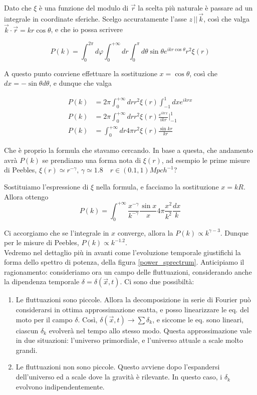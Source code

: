 \documentclass{report}
\begin{document}
Dato che $\xi$ è una funzione del modulo di $\vec{r}$ la scelta più naturale è passare ad un integrale in coordinate sferiche. Scelgo accuratamente l'asse $z \, || \, \vec{k}$, così che valga $\vec{k}\cdot \vec{r} = kr\cos{\theta}$, e che io possa scrivere 

\begin{equation}
    P(k) = \int_0^{2\pi}d\varphi\int_0^{+\infty}dr\int_0^\pi d\theta \sin{\theta}e^{ikr\cos{\theta}}  r^2 \xi(r)
\end{equation}

A questo punto conviene effettuare la sostituzione $x = \cos{\theta}$, così che $dx = -\sin{\theta}d\theta$, e dunque che valga 

\begin{align}
    P(k) &= 2\pi \int_0^{+\infty}dr r^2\xi(r)\int_{-1}^1dx e^{ikrx} \\
    P(k)&= 2\pi \int_0^{+\infty}dr r^2\xi(r)\frac{e^{ikrx}}{ikr}\biggr|^1_{-1} \\
    P(k )&= \int_0^{+\infty}dr 4\pi r^2\xi(r)\frac{\sin{kr}}{kr} 
\end{align}

Che è proprio la formula che stavamo cercando. In base a questa, che andamento avrà $P(k)$ se prendiamo una forma nota di $\xi(r)$, ad esempio le prime misure di Peebles, $\xi(r) \simeq r^{-\gamma}, \, \gamma \simeq 1.8 \quad r\in (0.1, 1) Mpch^{-1}$?

Sostituiamo l'espressione di $\xi$ nella formula, e facciamo la sostituzione $x = kR$. Allora ottengo 
\begin{equation}
    P(k) = \int_0^{+\infty} \frac{x^{-\gamma}}{k^{-\gamma}}\frac{\sin{x}}{x}4\pi\frac{x^2}{k^2}\frac{dx}{k}
\end{equation}

Ci accorgiamo che se l'integrale in $x$ converge, allora la $P(k) \propto k^{\gamma -3}$. Dunque per le misure di Peebles, $P(k)\propto k^{-1.2}$. \\

Vedremo nel dettaglio più in avanti come l'evoluzione temporale giustifichi la forma dello spettro di potenza, della figura \ref{power_sprectrum}. Anticipiamo il ragionamento: consideriamo ora un campo delle fluttuazioni, considerando anche la dipendenza temporale $\delta = \delta(\vec{x}, t)$. Ci sono due possibiltà: 
\begin{enumerate}
    \item 
    Le fluttuazioni sono piccole. Allora la decomposizione in serie di Fourier può considerarsi in ottima approssimazione esatta, e posso linearizzare le eq. del moto per il campo $\delta$. Così, $\delta(\vec{x}, t ) \rightarrow \sum \delta_k$, e siccome le eq. sono lineari, ciascun $\delta_k$ evolverà nel tempo allo stesso modo. Questa approssimazione vale in due situazioni: l'universo primordiale, e l'universo attuale a scale molto grandi. 
    \item 
    Le fluttuazioni non sono piccole. Questo avviene dopo l'espandersi dell'universo ed a scale dove la gravità è rilevante. In questo caso, i $\delta_k$ evolvono indipendentemente. 
\end{enumerate}
\end{document}
